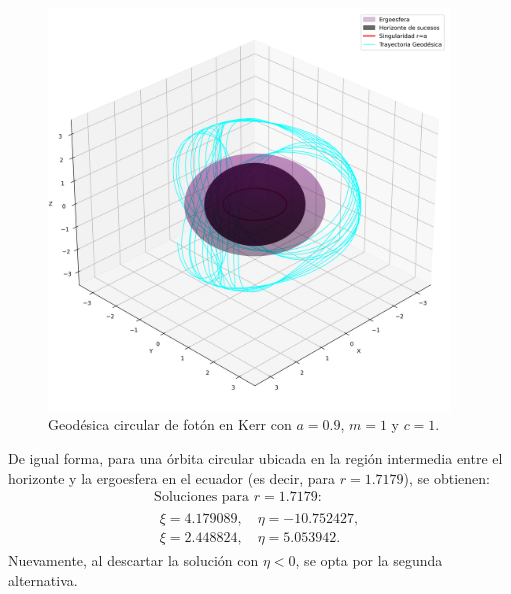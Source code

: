 \begin{figure}[H]
    \begin{small}
        \begin{center}
            \includegraphics[width=0.95\textwidth]{AgujerosNegros/kerr/geodesics_plots/geodesica_circular_foton_r3.png}
        \end{center}
        \caption{Geodésica circular de fotón en Kerr con $a = 0.9$, $m=1$ y $c=1$.}
        \label{fig:geodesica_circular_foton_r3}
    \end{small}
\end{figure}

De igual forma, para una órbita circular ubicada en la región intermedia entre el horizonte y la ergoesfera en el ecuador (es decir, para $r=1.7179$), se obtienen:
\begin{equation}
\begin{array}{l}
\text{Soluciones para } r=1.7179: \\
\begin{array}{l}
\xi = 4.179089,\quad \eta = -10.752427, \\
\xi = 2.448824,\quad \eta = 5.053942.
\end{array}
\end{array}
\end{equation}
Nuevamente, al descartar la solución con $\eta < 0$, se opta por la segunda alternativa.

